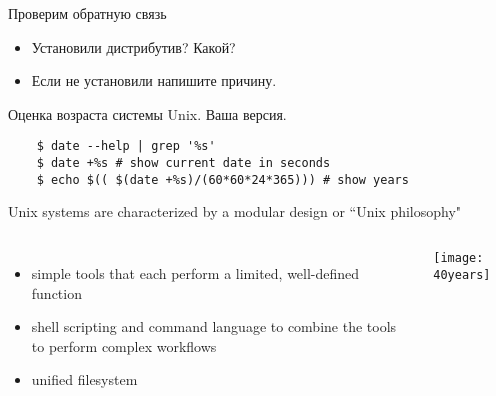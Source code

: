 \begin{frame}{Проверим обратную связь}
\begin{itemize}
    \item Установили дистрибутив? Какой?
    \item Если не установили напишите причину.
\end{itemize}
\end{frame}

\begin{frame}[fragile]{Оценка возраста системы Unix.}
Ваша версия.
 \pause
\begin{lstlisting}
    $ date --help | grep '%s'
    $ date +%s # show current date in seconds 
    $ echo $(( $(date +%s)/(60*60*24*365))) # show years
\end{lstlisting} 
\pause
Unix systems are characterized by a \alert{modular design} or ``Unix philosophy"
		\begin{columns}
\begin{itemize}
    \item simple tools that each perform a limited, well-defined function
    \item shell scripting and command language to combine the tools to perform complex workflows
    \item unified filesystem
\end{itemize}
            \texttt{[image: 40years]}
		\end{columns}
\end{frame}


